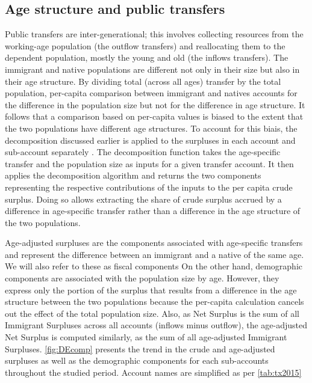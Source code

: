 \subsection{Age structure and public transfers}

Public transfers are inter-generational; this involves collecting resources from the working-age population (the outflow transfers) and reallocating them to the dependent population, mostly the young and old (the inflows transfers).
The immigrant and native populations are different not only in their size but also in their age structure.
By dividing total (across all ages) transfer by the total population, per-capita comparison between immigrant and natives accounts for the difference in the population size but not for the difference in age structure.
It follows that a comparison based on per-capita values is biased to the extent that the two populations have different age structures.
To account for this biais, the decomposition discussed earlier is applied to the surpluses in each account and sub-account separately .
The decomposition function takes the age-specific transfer and the population size as inputs for a given transfer account. It then applies the decomposition algorithm and returns the two components representing the respective contributions of the inputs to the per capita crude surplus.
Doing so allows extracting the share of crude surplus accrued by a difference in age-specific transfer rather than a difference in the age structure of the two populations.

\vspace{0.7em}\par
Age-adjusted surpluses are the components associated with age-specific transfers and represent the difference between an immigrant and a native of the same age.
We will also refer to these as fiscal components
On the other hand, demographic components are associated with the population size by age.
However, they express only the portion of the surplus that results from a difference in the age structure between the two populations because the per-capita calculation cancels out the effect of the total population size.
Also, as Net Surplus is the sum of all Immigrant Surpluses across all accounts (inflows minus outflow), the age-adjusted Net Surplus is computed similarly, as the sum of all age-adjusted Immigrant Surpluses. \autoref{fig:DEcomp} presents the trend in the crude and age-adjusted surpluses as well as the demographic components for each sub-accounts throughout the studied period.
Account names are simplified as per \autoref{tab:tx2015}


